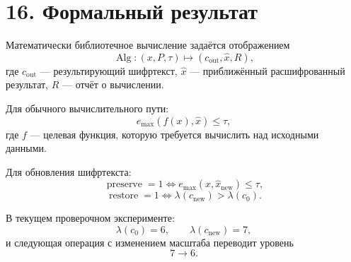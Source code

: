 \documentclass[12pt]{article}
\newcommand{\lvl}{\lambda}
\begin{document}
\section*{16. Формальный результат}

Математически библиотечное вычисление задаётся отображением
\[
    \operatorname{Alg}:
    (x,P,\tau)
    \mapsto
    (c_{\operatorname{out}},\hat{x},R),
\]
где \(c_{\operatorname{out}}\) --- результирующий шифртекст,
\(\hat{x}\) --- приближённый расшифрованный результат, \(R\) --- отчёт
о вычислении.

Для обычного вычислительного пути:
\[
    e_{\max}(f(x),\hat{x})\leq\tau,
\]
где \(f\) --- целевая функция, которую требуется вычислить над исходными
данными.

Для обновления шифртекста:
\[
    \operatorname{preserve}=1
    \Longleftrightarrow
    e_{\max}(x,\hat{x}_{\operatorname{new}})\leq\tau,
\]
\[
    \operatorname{restore}=1
    \Longleftrightarrow
    \lvl(c_{\operatorname{new}})>\lvl(c_0).
\]

В текущем проверочном эксперименте:
\[
    \lvl(c_0)=6,
    \qquad
    \lvl(c_{\operatorname{new}})=7,
\]
и следующая операция с изменением масштаба переводит уровень
\[
    7\rightarrow 6.
\]
\end{document}
